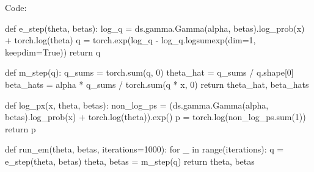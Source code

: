 \documentclass[submit]{harvardml}
\begin{document}
\begin{enumerate}
    Code:

    \begin{python}
def e_step(theta, betas):
    log_q = ds.gamma.Gamma(alpha, betas).log_prob(x) + torch.log(theta)
    q = torch.exp(log_q - log_q.logsumexp(dim=1, keepdim=True))
    return q


def m_step(q):
    q_sums = torch.sum(q, 0)
    theta_hat = q_sums / q.shape[0]
    beta_hats = alpha * q_sums / torch.sum(q * x, 0)
    return theta_hat, beta_hats


def log_px(x, theta, betas):
    non_log_ps = (ds.gamma.Gamma(alpha, betas).log_prob(x) + torch.log(theta)).exp()
    p = torch.log(non_log_ps.sum(1))
    return p


def run_em(theta, betas, iterations=1000):
    for _ in range(iterations):
        q = e_step(theta, betas)
        theta, betas = m_step(q)
    return theta, betas
    \end{python}
\end{enumerate}


\newpage
\end{document}
